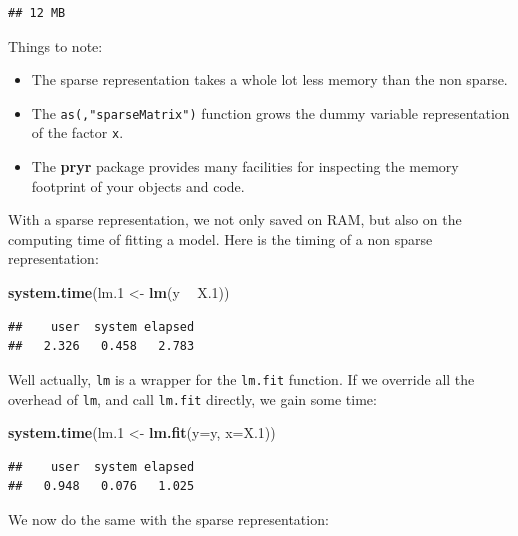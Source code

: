 \documentclass[]{book}
\newenvironment{Shaded}{\begin{snugshade}}{\end{snugshade}}
\newcommand{\KeywordTok}[1]{\textcolor[rgb]{0.13,0.29,0.53}{\textbf{#1}}}
\newcommand{\DataTypeTok}[1]{\textcolor[rgb]{0.13,0.29,0.53}{#1}}
\newcommand{\DecValTok}[1]{\textcolor[rgb]{0.00,0.00,0.81}{#1}}
\newcommand{\StringTok}[1]{\textcolor[rgb]{0.31,0.60,0.02}{#1}}
\newcommand{\OperatorTok}[1]{\textcolor[rgb]{0.81,0.36,0.00}{\textbf{#1}}}
\newcommand{\NormalTok}[1]{#1}
\providecommand{\tightlist}{%
  \setlength{\itemsep}{0pt}\setlength{\parskip}{0pt}}
\theoremstyle{definition}
\theoremstyle{definition}
\theoremstyle{definition}
\theoremstyle{remark}
\begin{document}
\begin{verbatim}
## 12 MB
\end{verbatim}

Things to note:

\begin{itemize}
\tightlist
\item
  The sparse representation takes a whole lot less memory than the non
  sparse.
\item
  The \texttt{as(,"sparseMatrix")} function grows the dummy variable
  representation of the factor \texttt{x}.
\item
  The \textbf{pryr} package provides many facilities for inspecting the
  memory footprint of your objects and code.
\end{itemize}

With a sparse representation, we not only saved on RAM, but also on the
computing time of fitting a model. Here is the timing of a non sparse
representation:

\begin{Shaded}
\begin{Highlighting}[]
\KeywordTok{system.time}\NormalTok{(lm.}\DecValTok{1}\NormalTok{ <-}\StringTok{ }\KeywordTok{lm}\NormalTok{(y }\OperatorTok{~}\StringTok{ }\NormalTok{X.}\DecValTok{1}\NormalTok{)) }
\end{Highlighting}
\end{Shaded}

\begin{verbatim}
##    user  system elapsed 
##   2.326   0.458   2.783
\end{verbatim}

Well actually, \texttt{lm} is a wrapper for the \texttt{lm.fit}
function. If we override all the overhead of \texttt{lm}, and call
\texttt{lm.fit} directly, we gain some time:

\begin{Shaded}
\begin{Highlighting}[]
\KeywordTok{system.time}\NormalTok{(lm.}\DecValTok{1}\NormalTok{ <-}\StringTok{ }\KeywordTok{lm.fit}\NormalTok{(}\DataTypeTok{y=}\NormalTok{y, }\DataTypeTok{x=}\NormalTok{X.}\DecValTok{1}\NormalTok{))}
\end{Highlighting}
\end{Shaded}

\begin{verbatim}
##    user  system elapsed 
##   0.948   0.076   1.025
\end{verbatim}

We now do the same with the sparse representation:
\end{document}
